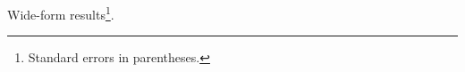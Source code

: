 \documentclass[article]{jss}
\begin{document}
\begin{table}
Wide-form results\footnote{Standard errors in parentheses.}.
\caption{Estimates across all three specifications.}
\end{table}
\end{document}
